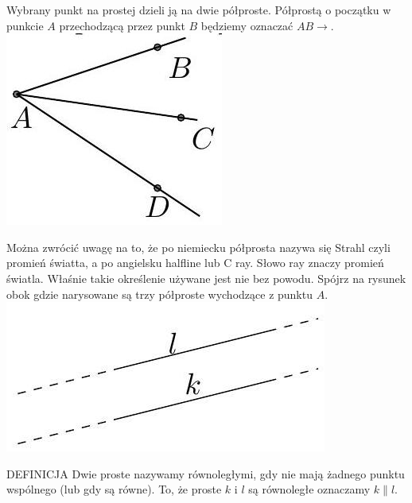 \documentclass[10pt]{article}
\begin{document}
Wybrany punkt na prostej dzieli ją na dwie półproste. Półprostą o początku w punkcie \(A\) przechodzącą przez punkt \(B\) będziemy oznaczać \(A B \rightarrow\).\\
\includegraphics[max width=\textwidth, center]{2024_11_21_71f62bd117d375398909g-007(2)}

Można zwrócić uwagę na to, że po niemiecku półprosta nazywa się Strahl czyli promień światta, a po angielsku halfline lub C ray. Słowo ray znaczy promień światla. Właśnie takie określenie używane jest nie bez powodu. Spójrz na rysunek obok gdzie narysowane są trzy półproste wychodzące z punktu \(A\).\\
\includegraphics[max width=\textwidth, center]{2024_11_21_71f62bd117d375398909g-007(1)}

DEFINICJA Dwie proste nazywamy równoległymi, gdy nie mają żadnego punktu wspólnego (lub gdy są równe). To, że proste \(k\) i \(l\) są równoległe oznaczamy \(k \| l\).
\end{document}
